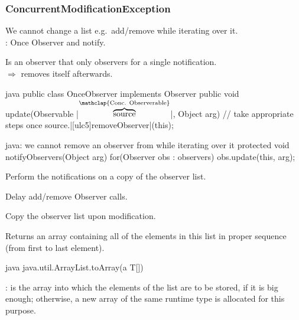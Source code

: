 \subsubsection{ConcurrentModificationException}
\label{subsubsec:ConcurrentModificationException}
\begin{defnbox}\nospacing
  \begin{defn}
    We cannot change a list e.g.\ add/remove while iterating over it.\\
    : Once Observer and notify.
  \end{defn}
\end{defnbox}
\begin{defnbox}\nospacing
  \begin{defn}[OnceObserver]\label{defn:OnceObserver}
    Is an observer that only observers for a single notification.\\
    $\Rightarrow$ removes itself afterwards.
  \end{defn}
\end{defnbox}
\begin{codeboxNl}[OnceObserver]{java}
public class OnceObserver implements Observer {
  public void update(Observable |$\overbrace{\text{source}}^{\mathclap{\text{Conc. Observerable}}}$|, Object arg) {
        // take appropriate steps once
        source.|\ul[ulc5]{removeObserver}|(this);
  }
}
\end{codeboxNl}
\begin{codeboxcomment}[Problem]{0.74}{java}{: we cannot remove an
    observer from  while iterating over it}
protected void notifyObservers(Object arg){
  for(Observer obs : observers){
    obs.update(this, arg);
  }
}
\end{codeboxcomment}
\begin{sectionbox}[Solutions]\nospacing
  \begin{circlelistnosep}
      \item Perform the notifications on a copy of the observer list.
      \item Delay add/remove Observer calls.
      \item Copy the observer list upon modification.
  \end{circlelistnosep}
\end{sectionbox}
\begin{defnbox}\nospacing
  \begin{defn}
    Returns an array containing all of the elements in this list in proper sequence (from first to last element).
    \begin{mintlinebox}{java}
      java.util.ArrayList.toArray(a T[])
    \end{mintlinebox}
    : is the array into which the elements of the list are to be
    stored, if it is big enough; otherwise, a new array of the same runtime type is allocated for this purpose.
  \end{defn}
\end{defnbox}
